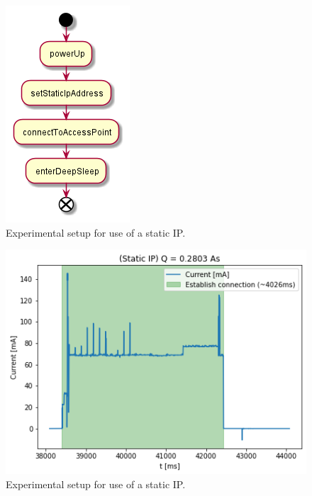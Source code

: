 \begin{figure}[h]
    \centering
    \includegraphics[width = 0.35 \linewidth]{fig/sequence_static_ip.png}
    \caption{Experimental setup for use of a static IP.}
    \label{fig:experiment_static_ip}
\end{figure}
\begin{figure}[h]
    \centering
    \includegraphics[width =\linewidth]{fig/static_ip.png}
    \caption{Experimental setup for use of a static IP.}
    \label{fig:static_ip}
\end{figure}
